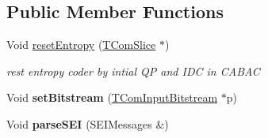 \subsection*{Public Member Functions}
\begin{DoxyCompactItemize}
\item 
\mbox{\label{class_t_dec_cavlc_a9c36067c414ee8c81994bcce15d8d9d1}} 
Void \hyperlink{class_t_dec_cavlc_a9c36067c414ee8c81994bcce15d8d9d1}{reset\+Entropy} (\hyperlink{class_t_com_slice}{T\+Com\+Slice} $\ast$)
\begin{DoxyCompactList}\small\item\em rest entropy coder by intial QP and I\+DC in C\+A\+B\+AC \end{DoxyCompactList}\item 
\mbox{\label{class_t_dec_cavlc_a6eb46515b16fbc3a7ae20fc9a2dc90d2}} 
Void {\bfseries set\+Bitstream} (\hyperlink{class_t_com_input_bitstream}{T\+Com\+Input\+Bitstream} $\ast$p)
\item 
\mbox{\label{class_t_dec_cavlc_a31fbd8f20803f6c62746158fedd80e28}} 
Void {\bfseries parse\+S\+EI} (S\+E\+I\+Messages \&)
\end{DoxyCompactItemize}
